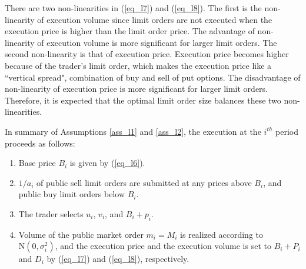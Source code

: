 There are two non-linearities in (\ref{eq_l7}) and (\ref{eq_l8}).  The first is the non-linearity of execution volume since limit orders are not executed when the execution price is higher than the limit order price.  The advantage of non-linearity of execution volume is more significant for larger limit orders.  The second non-linearity is that of execution price.  Execution price becomes higher because of the trader's limit order, which makes the execution price like a ``vertical spread", combination of buy and sell of put options.  The disadvantage of non-linearity of execution price is more significant for larger limit orders.  Therefore, it is expected that the optimal limit order size balances these two non-linearities.

In summary of Assumptions \ref{ass_l1} and \ref{ass_l2}, the execution at the $i^{th}$ period proceeds as follows:
\begin{enumerate}
\item Base price $B_i$ is given by (\ref{eq_l6}).
\item $1/a_i$ of public sell limit orders are submitted at any prices above $B_i$, and public buy limit orders below $B_i$.  
\item The trader selects $u_i$, $v_i$, and $B_i+p_i$.
\item Volume of the public market order $m_i=M_i$ is realized according to $\mbox{N}(0,\sigma_i^2)$, and the execution price and the execution volume is set to $B_i+P_i$ and $D_i$ by (\ref{eq_l7}) and (\ref{eq_l8}), respectively.
\end{enumerate}


